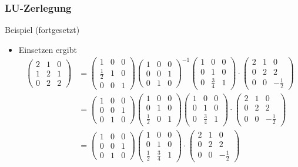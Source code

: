\documentclass{beamer}
\newcommand{\mytitle}{LU-Zerlegung}
\begin{document}
\begin{frame}\frametitle{\mytitle}
	\begin{block}{Beispiel (fortgesetzt)}
		\begin{itemize}
			\item Einsetzen ergibt
				\begin{align*}
					\begin{pmatrix} 2&1&0\\ 1&2&1\\ 0&2&2  \end{pmatrix}&=\begin{pmatrix} 1&0&0\\ \frac{1}{2}&1&0\\ 0&0&1 \end{pmatrix}\begin{pmatrix} 1&0&0\\ 0&0&1\\0&1&0 \end{pmatrix}^{-1}\begin{pmatrix}1&0&0\\0&1&0\\0&\frac{3}{4}&1\end{pmatrix}\cdot\begin{pmatrix} 2&1&0\\ 0&2&2\\ 0&0&-\frac{1}{2} \end{pmatrix}\\
									 &=\begin{pmatrix} 1&0&0\\ 0&0&1\\0&1&0 \end{pmatrix}\begin{pmatrix} 1&0&0\\ 0&1&0\\ \frac{1}{2}&0&1 \end{pmatrix}\begin{pmatrix}1&0&0\\0&1&0\\0&\frac{3}{4}&1\end{pmatrix}\cdot\begin{pmatrix} 2&1&0\\ 0&2&2\\ 0&0&-\frac{1}{2} \end{pmatrix}\\
									 &=\begin{pmatrix} 1&0&0\\ 0&0&1\\0&1&0 \end{pmatrix}\begin{pmatrix}1&0&0\\0&1&0\\\frac{1}{2}&\frac{3}{4}&1\end{pmatrix}\cdot\begin{pmatrix} 2&1&0\\ 0&2&2\\ 0&0&-\frac{1}{2} \end{pmatrix}	
				\end{align*}
		\end{itemize}
	\end{block}
\end{frame}
\end{document}
